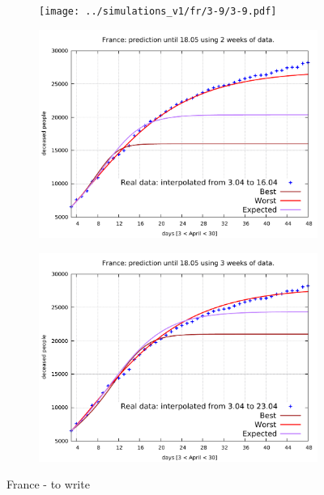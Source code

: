 \documentclass[8pt]{article}
\begin{document}
\begin{figure}[h!]
  \centering
  \begin{subfigure}[b]{0.45\linewidth}
  \texttt{[image: ../simulations\_v1/fr/3-9/3-9.pdf]}
  \end{subfigure}
  \begin{subfigure}[b]{0.45\linewidth}
    \includegraphics[width=\linewidth]{../simulations_v1/fr/3-16/3-16.pdf}
  \end{subfigure}
  \begin{subfigure}[b]{0.45\linewidth}
  \includegraphics[width=\linewidth]{../simulations_v1/fr/3-23/3-23.pdf}
  \end{subfigure}
	\caption{France - to write}
\end{figure}
\end{document}
